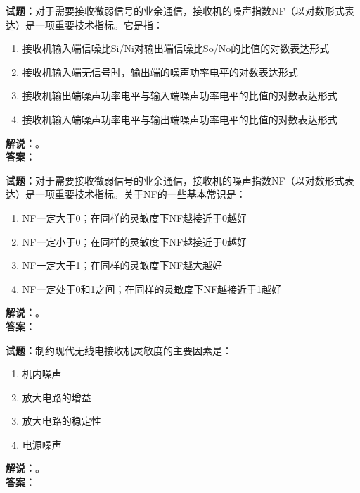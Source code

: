 \documentclass{ctexbook}
\begin{document}
\bigskip




\noindent\textbf{试题：}对于需要接收微弱信号的业余通信，接收机的噪声指数NF（以对数形式表达）是一项重要技术指标。它是指：
\begin{enumerate}[leftmargin=3em]
\item 接收机输入端信噪比Si/Ni对输出端信噪比So/No的比值的对数表达形式
\item 接收机输入端无信号时，输出端的噪声功率电平的对数表达形式
\item 接收机输出端噪声功率电平与输入端噪声功率电平的比值的对数表达形式
\item 接收机输入端噪声功率电平与输出端噪声功率电平的比值的对数表达形式
\end{enumerate}
\noindent\textbf{解说：}\textbf{}。\\\noindent\textbf{答案：}

\bigskip




\noindent\textbf{试题：}对于需要接收微弱信号的业余通信，接收机的噪声指数NF（以对数形式表达）是一项重要技术指标。关于NF的一些基本常识是：
\begin{enumerate}[leftmargin=3em]
\item NF一定大于0；在同样的灵敏度下NF越接近于0越好
\item NF一定小于0；在同样的灵敏度下NF越接近于0越好
\item NF一定大于1；在同样的灵敏度下NF越大越好
\item NF一定处于0和1之间；在同样的灵敏度下NF越接近于1越好
\end{enumerate}
\noindent\textbf{解说：}\textbf{}。\\\noindent\textbf{答案：}

\bigskip




\noindent\textbf{试题：}制约现代无线电接收机灵敏度的主要因素是：
\begin{enumerate}[leftmargin=3em]
\item 机内噪声
\item 放大电路的增益
\item 放大电路的稳定性
\item 电源噪声
\end{enumerate}
\noindent\textbf{解说：}\textbf{}。\\\noindent\textbf{答案：}

\bigskip
\end{document}
